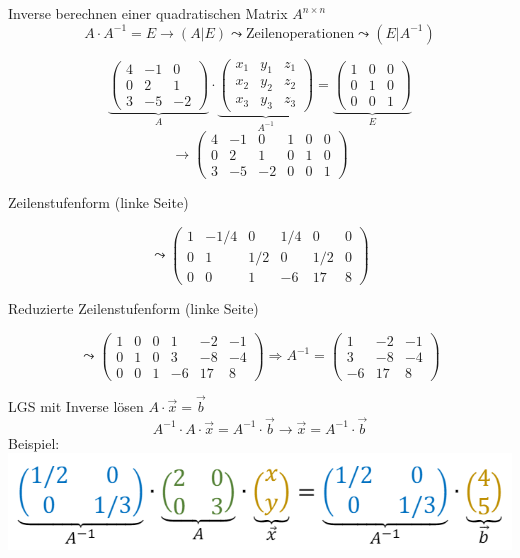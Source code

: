 \begin{KR}{Inverse berechnen} einer quadratischen Matrix $A^{n \times n}$
    $$A \cdot A^{-1} = E \rightarrow \left( A | E \right) \leadsto \text{Zeilenoperationen} \leadsto \left( E | A^{-1}\right)$$
\end{KR}

\begin{example}
    $$
\underbrace{\left(\begin{array}{ccc}
4 & -1 & 0 \\
0 & 2 & 1 \\
3 & -5 & -2
\end{array}\right)}_{A} \cdot \underbrace{\left(\begin{array}{lll}
x_{1} & y_{1} & z_{1} \\
x_{2} & y_{2} & z_{2} \\
x_{3} & y_{3} & z_{3}
\end{array}\right)}_{A^{-1}}=\underbrace{\left(\begin{array}{lll}
1 & 0 & 0 \\
0 & 1 & 0 \\
0 & 0 & 1
\end{array}\right)}_{E}$$
$$ \rightarrow\left(\begin{array}{ccc|ccc}
4 & -1 & 0 & 1 & 0 & 0 \\
0 & 2 & 1 & 0 & 1 & 0 \\
3 & -5 & -2 & 0 & 0 & 1
\end{array}\right)
$$

Zeilenstufenform (linke Seite)

$$ \leadsto 
\left(\begin{array}{ccc|ccc}
1 & -1 / 4 & 0 & 1 / 4 & 0 & 0 \\
0 & 1 & 1 / 2 & 0 & 1 / 2 & 0 \\
0 & 0 & 1 & -6 & 17 & 8
\end{array}\right)
$$

Reduzierte Zeilenstufenform (linke Seite)

$$ \leadsto 
\left(\begin{array}{ccc|ccc}
1 & 0 & 0 & 1 & -2 & -1 \\
0 & 1 & 0 & 3 & -8 & -4 \\
0 & 0 & 1 & -6 & 17 & 8
\end{array}\right) \Rightarrow A^{-1}=\left(\begin{array}{ccc}
1 & -2 & -1 \\
3 & -8 & -4 \\
-6 & 17 & 8
\end{array}\right)
$$
\end{example}



\begin{concept}{LGS mit Inverse lösen}
    $A \cdot \vec{x} = \vec{b}$
    $$A^{-1} \cdot A \cdot \vec{x} = A^{-1} \cdot \vec{b} \rightarrow \vec{x} = A^{-1} \cdot \vec{b}$$
    Beispiel:\\
    \includegraphics[width=0.7\linewidth]{images/lgs_inverse.png}
\end{concept}



